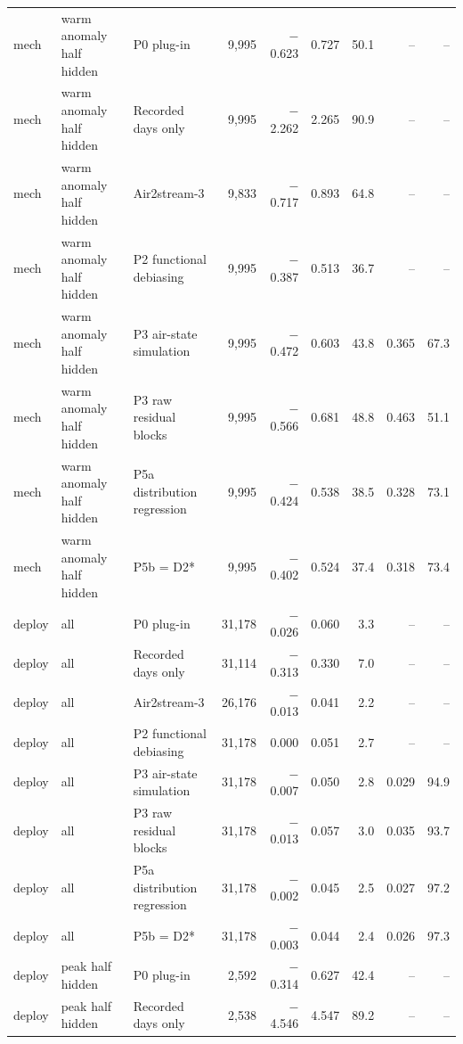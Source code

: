 \begin{table}
{\begin{tabular}{lllrrrrrr}
mech & warm anomaly half hidden & P0 plug-in & 9{,}995 & \ensuremath{-}0.623 & 0.727 & 50.1 & -- & -- \\
mech & warm anomaly half hidden & Recorded days only & 9{,}995 & \ensuremath{-}2.262 & 2.265 & 90.9 & -- & -- \\
mech & warm anomaly half hidden & Air2stream-3 & 9{,}833 & \ensuremath{-}0.717 & 0.893 & 64.8 & -- & -- \\
mech & warm anomaly half hidden & P2 functional debiasing & 9{,}995 & \ensuremath{-}0.387 & 0.513 & 36.7 & -- & -- \\
mech & warm anomaly half hidden & P3 air-state simulation & 9{,}995 & \ensuremath{-}0.472 & 0.603 & 43.8 & 0.365 & 67.3 \\
mech & warm anomaly half hidden & P3 raw residual blocks & 9{,}995 & \ensuremath{-}0.566 & 0.681 & 48.8 & 0.463 & 51.1 \\
mech & warm anomaly half hidden & P5a distribution regression & 9{,}995 & \ensuremath{-}0.424 & 0.538 & 38.5 & 0.328 & 73.1 \\
mech & warm anomaly half hidden & P5b = D2* & 9{,}995 & \ensuremath{-}0.402 & 0.524 & 37.4 & 0.318 & 73.4 \\
deploy & all & P0 plug-in & 31{,}178 & \ensuremath{-}0.026 & 0.060 & 3.3 & -- & -- \\
deploy & all & Recorded days only & 31{,}114 & \ensuremath{-}0.313 & 0.330 & 7.0 & -- & -- \\
deploy & all & Air2stream-3 & 26{,}176 & \ensuremath{-}0.013 & 0.041 & 2.2 & -- & -- \\
deploy & all & P2 functional debiasing & 31{,}178 & 0.000 & 0.051 & 2.7 & -- & -- \\
deploy & all & P3 air-state simulation & 31{,}178 & \ensuremath{-}0.007 & 0.050 & 2.8 & 0.029 & 94.9 \\
deploy & all & P3 raw residual blocks & 31{,}178 & \ensuremath{-}0.013 & 0.057 & 3.0 & 0.035 & 93.7 \\
deploy & all & P5a distribution regression & 31{,}178 & \ensuremath{-}0.002 & 0.045 & 2.5 & 0.027 & 97.2 \\
deploy & all & P5b = D2* & 31{,}178 & \ensuremath{-}0.003 & 0.044 & 2.4 & 0.026 & 97.3 \\
deploy & peak half hidden & P0 plug-in & 2{,}592 & \ensuremath{-}0.314 & 0.627 & 42.4 & -- & -- \\
deploy & peak half hidden & Recorded days only & 2{,}538 & \ensuremath{-}4.546 & 4.547 & 89.2 & -- & -- \\

\end{tabular}}
\end{table}
